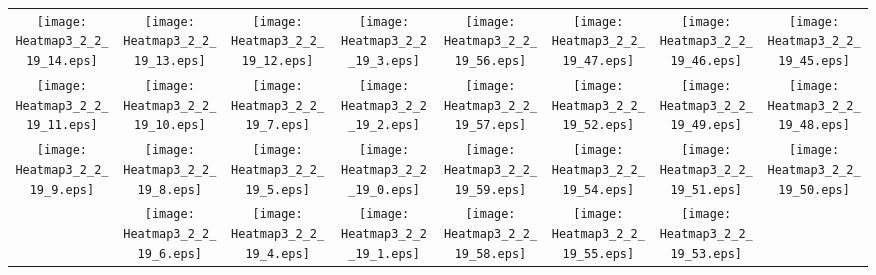 \documentclass{standalone}
\begin{document}
\begin{tabular}{ *8{c} }
\texttt{[image: Heatmap3\_2\_2\_19\_14.eps]} & \texttt{[image: Heatmap3\_2\_2\_19\_13.eps]} & \texttt{[image: Heatmap3\_2\_2\_19\_12.eps]} & \texttt{[image: Heatmap3\_2\_2\_19\_3.eps]} & \texttt{[image: Heatmap3\_2\_2\_19\_56.eps]} & \texttt{[image: Heatmap3\_2\_2\_19\_47.eps]} & \texttt{[image: Heatmap3\_2\_2\_19\_46.eps]} & \texttt{[image: Heatmap3\_2\_2\_19\_45.eps]} \\
\texttt{[image: Heatmap3\_2\_2\_19\_11.eps]} & \texttt{[image: Heatmap3\_2\_2\_19\_10.eps]} & \texttt{[image: Heatmap3\_2\_2\_19\_7.eps]} & \texttt{[image: Heatmap3\_2\_2\_19\_2.eps]} & \texttt{[image: Heatmap3\_2\_2\_19\_57.eps]} & \texttt{[image: Heatmap3\_2\_2\_19\_52.eps]} & \texttt{[image: Heatmap3\_2\_2\_19\_49.eps]} & \texttt{[image: Heatmap3\_2\_2\_19\_48.eps]} \\
\texttt{[image: Heatmap3\_2\_2\_19\_9.eps]} & \texttt{[image: Heatmap3\_2\_2\_19\_8.eps]} & \texttt{[image: Heatmap3\_2\_2\_19\_5.eps]} & \texttt{[image: Heatmap3\_2\_2\_19\_0.eps]} & \texttt{[image: Heatmap3\_2\_2\_19\_59.eps]} & \texttt{[image: Heatmap3\_2\_2\_19\_54.eps]} & \texttt{[image: Heatmap3\_2\_2\_19\_51.eps]} & \texttt{[image: Heatmap3\_2\_2\_19\_50.eps]} \\
 & \texttt{[image: Heatmap3\_2\_2\_19\_6.eps]} & \texttt{[image: Heatmap3\_2\_2\_19\_4.eps]} & \texttt{[image: Heatmap3\_2\_2\_19\_1.eps]} & \texttt{[image: Heatmap3\_2\_2\_19\_58.eps]} & \texttt{[image: Heatmap3\_2\_2\_19\_55.eps]} & \texttt{[image: Heatmap3\_2\_2\_19\_53.eps]} &  
\end{tabular}
\end{document}
